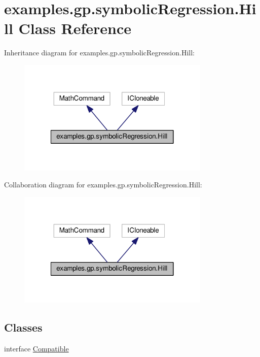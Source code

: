 \hypertarget{classexamples_1_1gp_1_1symbolic_regression_1_1_hill}{\section{examples.\-gp.\-symbolic\-Regression.\-Hill Class Reference}
\label{classexamples_1_1gp_1_1symbolic_regression_1_1_hill}
}


Inheritance diagram for examples.\-gp.\-symbolic\-Regression.\-Hill\-:
\nopagebreak
\begin{figure}[H]
\begin{center}
\leavevmode
\includegraphics[width=260pt]{classexamples_1_1gp_1_1symbolic_regression_1_1_hill__inherit__graph}
\end{center}
\end{figure}


Collaboration diagram for examples.\-gp.\-symbolic\-Regression.\-Hill\-:
\nopagebreak
\begin{figure}[H]
\begin{center}
\leavevmode
\includegraphics[width=260pt]{classexamples_1_1gp_1_1symbolic_regression_1_1_hill__coll__graph}
\end{center}
\end{figure}
\subsection*{Classes}
\begin{DoxyCompactItemize}
\item 
interface \hyperlink{interfaceexamples_1_1gp_1_1symbolic_regression_1_1_hill_1_1_compatible}{Compatible}
\end{DoxyCompactItemize}
